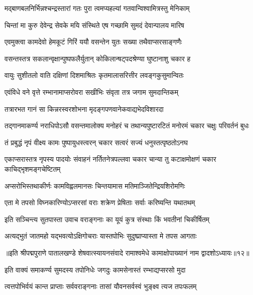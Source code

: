 \twolineshloka
{मद्बाणबलनिर्भिन्नश्चन्द्रस्तारां गतः पुरा}
{त्वमप्यहल्यां गतवान्विश्वामित्रस्तु मेनिकाम्}%

\twolineshloka
{चिन्तां मा कुरु देवेन्द्र सेवके मयि संस्थिते}
{एष गच्छामि सुमदं देवान्पालय मारिष}%

\twolineshloka
{एवमुक्त्वा कामदेवो हेमकूटं गिरिं ययौ}
{वसन्तेन युतः सख्या तथैवाप्सरसाङ्गणैः}%

\twolineshloka
{वसन्तस्तत्र सकलान्वृक्षान्पुष्पफलैर्युतान्}
{कोकिलान्षट्पदश्रेण्या घुष्टानाशु चकार ह}%

\twolineshloka
{वायुः सुशीतलो वाति दक्षिणां दिशमाश्रितः}
{कृतमालासरित्तीर लवङ्गकुसुमान्वितः}%

\twolineshloka
{एवंविधे वने वृत्ते रम्भानामाप्सरोवरा}
{सखीभिः संवृता तत्र जगाम सुमदान्तिकम्}%

\twolineshloka
{तत्रारभत गानं सा किन्नरस्वरशोभना}
{मृदङ्गपणवानेकवाद्यभेदविशारदा}%

\fourlineindentedshloka
{तद्गानमाकर्ण्य नराधिपोऽसौ}
{वसन्तमालोक्य मनोहरं च}
{तथान्यपुष्टारटितं मनोरमं}
{चकार चक्षुः परिवर्तनं बुधः}%

\twolineshloka
{तं प्रबुद्धं नृपं वीक्ष्य कामः पुष्पायुधस्त्वरन्}
{चकार सत्वरं सज्यं धनुस्तत्पृष्ठतोऽनघ}%

\fourlineindentedshloka
{एकाप्सरास्तत्र नृपस्य पादयोः}
{संवाहनं नर्तितनेत्रपल्लवा}
{चकार चान्या तु कटाक्षमोक्षणं}
{चकार काचिद्भृशमङ्गचेष्टितम्}%

\twolineshloka
{अप्सरोभिस्तथाकीर्णः कामविह्वलमानसः}
{चिन्तयामास मतिमाञ्जितेन्द्रियशिरोमणिः}%

\twolineshloka
{एता मे तपसो विघ्नकारिण्योऽप्सरसां वराः}
{शक्रेण प्रेषिताः सर्वाः करिष्यन्ति यथातथम्}%

\twolineshloka
{इति सञ्चिन्त्य सुतपास्ता उवाच वराङ्गनाः}
{का यूयं कुत्र संस्थाः किं भवतीनां चिकीर्षितम्}%

\twolineshloka
{अत्यद्भुतं जातमहो यद्भवत्योऽक्षिगोचराः}
{यास्तपोभिः सुदुष्प्राप्यास्ता मे तपस आगताः}%

{॥इति श्रीपद्मपुराणे पातालखण्डे शेषवात्स्यायनसंवादे रामाश्वमेधे कामाक्षोपाख्यानं नाम द्वादशोऽध्यायः॥१२॥}

\resetShloka


\twolineshloka
{इति वाक्यं समाकर्ण्य सुमदस्य तपोनिधेः}
{जगदुः कामसेनास्तं रम्भाद्यप्सरसो मुदा}%

\twolineshloka
{त्वत्तपोभिर्वयं कान्त प्राप्ताः सर्ववराङ्गनाः}
{तासां यौवनसर्वस्वं भुङ्क्ष्व त्यज तपःफलम्}%

